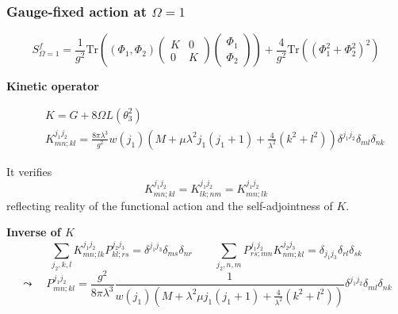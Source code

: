 \documentclass[9pt]{beamer}
\begin{document}
\begin{frame}

\frametitle{Gauge-fixed action at $\Omega=1$}

\vfill

\vspace*{-5pt}
\begin{equation*}
S^f_{\Omega=1} = \frac{1}{g^2} \mbox{Tr}\left( (\Phi_1,\Phi_2)
\begin{pmatrix}
K&0\\
0&K
\end{pmatrix} 
\begin{pmatrix}
\Phi_1\\
\Phi_2
\end{pmatrix} 
\right)
+ \frac{4}{g^2} \mbox{Tr}\left( \left(\Phi_1^2 + \Phi_2^2\right)^2\right)
\end{equation*}

\vspace*{10pt}

\textbf{Kinetic operator}

\begin{eqnarray*}
&& K = G+8\Omega L(\theta_3^2) \\
&& K^{j_1 j_2}_{mn;kl} = \frac{8\pi\lambda^3}{g^2} w(j_1) \left( M + \mu \lambda^2 j_1 (j_1+1) + \frac{4}{\lambda^2} (k^2+l^2) \right) \delta^{j_1j_2} \delta_{ml} \delta_{nk}
\end{eqnarray*}

It verifies
%
\begin{equation*}
K^{j_1j_2}_{mn;kl} = K^{j_1j_2}_{lk;nm} = K^{j_1j_2}_{mn;lk} 
\end{equation*}
%
reflecting reality of the functional action and the self-adjointness of $K$.

\vspace*{10pt}

\textbf{Inverse of $K$}
%
\begin{equation*}
\sum_{j_2,k,l} K^{j_1j_2}_{mn;lk} P^{j_2j_3}_{kl;rs} = \delta^{j_1j_3} \delta_{ms} \delta_{nr} \qquad \sum_{j_2,n,m} P^{j_1j_2}_{rs;mn} K^{j_2j_3}_{nm;kl} = \delta_{j_1j_3} \delta_{rl} \delta_{sk}
\end{equation*}
%
\begin{equation*}
\leadsto \quad P^{j_1j_2}_{mn;kl} = \frac{g^2}{8\pi\lambda^3} \frac{1}{w(j_1)(M+\lambda^2\mu j_1(j_1+1)+\frac{4}{\lambda^2}(k^2+l^2))}\delta^{j_1j_2}\delta_{ml}\delta_{nk}
\end{equation*}

\vfill

\end{frame}
\end{document}
